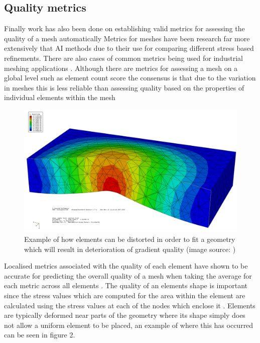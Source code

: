\documentclass{article}
\begin{document}
\subsection{Quality metrics}
\noindent
Finally work has also been done on establishing valid metrics for assessing the quality of a mesh automatically \cite{DittmerMeshQualityMet, NeuralNetworks} Metrics for meshes have been research far more extensively that AI methods due to their use for comparing different stress based refinements. There are also cases of common metrics being used for industrial meshing applications \cite{DittmerMeshQualityMet}. Although there are metrics for assessing a mesh on a global level such as element count score \cite{DittmerMeshQualityMet} the consensus is that due to the variation in meshes this is less reliable than assessing quality based on the properties of individual elements within the mesh \cite{DittmerMeshQualityMet} \\

\begin{figure}
  \centerline{\includegraphics[width=120mm, scale=1]{MeshQualityDeterioration.png}}
  \caption{Example of how elements can be distorted in order to fit a geometry which will result in deterioration of gradient quality (image source: \cite{PoorFEElementShapes})}
\end{figure}


\noindent
Localised metrics associated with the quality of each element have shown to be accurate for predicting the overall quality of a mesh when taking the average for each metric across all elements \cite{DittmerMeshQualityMet}. The quality of an elements shape is important since the stress values which are computed for the area within the element are calculated using the stress values at each of the nodes which enclose it \cite{IntroductionToFE}. Elements are typically deformed near parts of the geometry where its shape simply does not allow a uniform element to be placed, an example of where this has occurred can be seen in figure 2.\\ 
\end{document}
